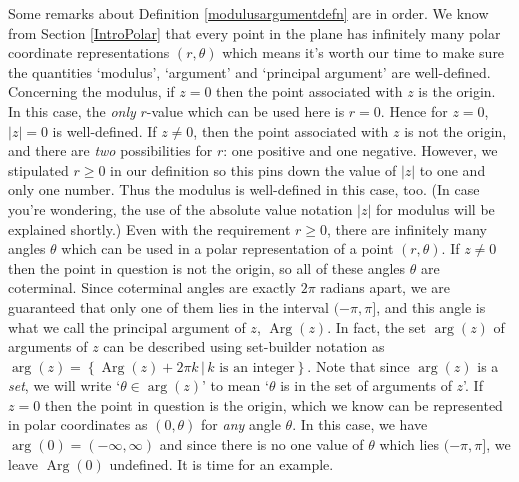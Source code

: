 Some remarks about  Definition \ref{modulusargumentdefn} are in order.  We know from Section \ref{IntroPolar} that every point in the plane has infinitely many polar coordinate representations $(r,\theta)$ which means it's worth our time to make sure the quantities `modulus', `argument' and `principal argument' are well-defined. Concerning the modulus, if $z = 0$ then the point associated with $z$ is the origin. In this case, the \textit{only} $r$-value which can be used here is $r=0$.  Hence for $z= 0$, $|z| = 0$ is well-defined. If $z \neq 0$, then the point associated with $z$ is not the origin, and there are \textit{two} possibilities for $r$:  one positive and one negative.  However, we stipulated $r \geq 0$ in our definition so this pins down the value of $|z|$ to one and only one number. Thus the modulus is well-defined in this case, too. (In case you're wondering, the use of the absolute value notation $|z|$ for modulus will be explained shortly.) Even with the requirement $r \geq 0$,  there are infinitely many angles $\theta$ which can be used in a polar representation of a point $(r,\theta)$. If $z \neq 0$ then the point in question is not the origin, so all of these angles $\theta$ are coterminal.  Since coterminal angles are exactly $2\pi$ radians apart, we are guaranteed that only one of them lies in the interval $(-\pi, \pi]$, and this angle is what we call the principal argument of $z$, $\operatorname{Arg}(z)$. In fact, the set $\operatorname{arg}(z)$ of  arguments of $z$ can be described using set-builder notation as  $\operatorname{arg}(z) = \left\{ \operatorname{Arg}(z) + 2\pi k \, | \, \text{$k$ is an integer} \right\}$.  Note that since $\operatorname{arg}(z)$ is a \textit{set}, we will write `$\theta \in \operatorname{arg}(z)$' to mean `$\theta$ is in the set of arguments of $z$'.   If $z=0$ then the point in question is the origin, which we know can be represented in polar coordinates as $(0,\theta)$ for \textit{any} angle $\theta$. In this case, we have $\operatorname{arg}(0) = (-\infty, \infty)$ and since there is no one value of $\theta$ which lies $(-\pi, \pi]$, we leave $\operatorname{Arg}(0)$ undefined. It is time for an example.

\medskip

